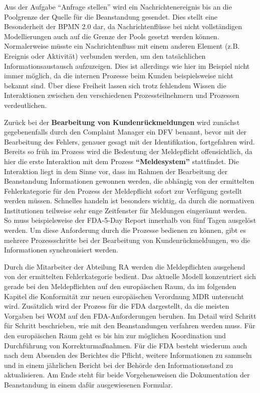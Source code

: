 \documentclass[a4paper,12pt]{report}
\begin{document}
Aus der Aufgabe "`Anfrage stellen"' wird ein Nachrichtenereignis bis an die Poolgrenze der Quelle für die Beanstandung gesendet. Dies stellt eine Besonderheit der BPMN 2.0 dar, da Nachrichtenflüsse bei nicht vollständigen Modellierungen auch auf die Grenze der Pools gesetzt werden können. Normalerweise müsste ein Nachrichtenfluss mit einem anderen Element (z.B. Ereignis oder Aktivität) verbunden werden, um den tatsächlichen Informationsaustausch aufzuzeigen. Dies ist allerdings wie hier im Beispiel nicht immer möglich, da die internen Prozesse beim Kunden beispielsweise nicht bekannt sind. Über diese Freiheit lassen sich trotz fehlendem Wissen die Interaktionen zwischen den verschiedenen Prozessteilnehmern und Prozessen verdeutlichen.

Zurück bei der \textbf{Bearbeitung von Kundenrückmeldungen} wird zunächst gegebenenfalls durch den Complaint Manager ein \ac{DFV} benannt, bevor mit der Bearbeitung des Fehlers, genauer gesagt mit der Identifikation, fortgefahren wird. Bereits so früh im Prozess wird die Bedeutung der Meldepflicht offensichtlich, da hier die erste Interaktion mit dem Prozess \textbf{"`Meldesystem"'} stattfindet. Die Interaktion liegt in dem Sinne vor, dass im Rahmen der Bearbeitung der Beanstandung Informationen gewonnen werden, die abhängig von der ermittelten Fehlerkategorie für den Prozess der Meldepflicht sofort zur Verfügung gestellt werden müssen. Schnelles handeln ist besonders wichtig, da durch die normativen Institutionen teilweise sehr enge Zeitfenster für Meldungen eingeräumt werden. So muss beispielsweise der FDA-5-Day Report innerhalb von fünf Tagen ausgelöst werden. Um diese Anforderung durch die Prozesse bedienen zu können, gibt es mehrere Prozessschritte bei der Bearbeitung von Kundenrückmeldungen, wo die Informationen synchronisiert werden. 

Durch die Mitarbeiter der Abteilung RA werden die Meldepflichten ausgehend von der ermittelten Fehlerkategorie bedient. Das aktuelle Modell konzentriert sich gerade bei den Meldepflichten auf den europäischen Raum, da im folgenden Kapitel die Konformität zur neuen europäischen Verordnung MDR untersucht wird. Zusätzlich wird der Prozess für die FDA dargestellt, da die meisten Vorgaben bei WOM auf den FDA-Anforderungen beruhen. Im Detail wird Schritt für Schritt beschrieben, wie mit den Beanstandungen verfahren werden muss. Für den europäischen Raum geht es bis hin zur möglichen Koordination und Durchführung von Korrekturmaßnahmen. Für die FDA besteht wiederum auch nach dem Absenden des Berichtes die Pflicht, weitere Informationen zu sammeln und in einem jährlichen Bericht bei der Behörde den Informationsstand zu aktualisieren. Am Ende steht für beide Vorgehensweisen die Dokumentation der Beanstandung in einem dafür ausgewiesenen Formular.
\end{document}

